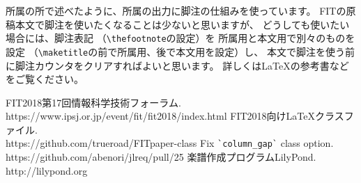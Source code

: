 \documentclass{FITpaper}
\begin{document}
所属の所で述べたように、所属の出力に脚注の仕組みを使っています。
FITの原稿本文で脚注を使いたくなることは少ないと思いますが、
どうしても使いたい場合には、脚注表記
（\texttt{\textbackslash thefootnote}の設定）を
所属用と本文用で別々のものを設定
（\texttt{\textbackslash maketitle}の前で所属用、後で本文用を設定）し、
本文で脚注を使う前に脚注カウンタをクリアすればよいと思います。
詳しくは\LaTeX の参考書などをご覧ください。


\begin{thebibliography}{9}

  FIT2018第17回情報科学技術フォーラム. \\
  https://www.ipsj.or.jp/event/fit/fit2018/index.html
  FIT2018向け\LaTeX クラスファイル. \\
  https://github.com/trueroad/FITpaper-class
  Fix \verb|`column_gap`| class option. \\
  https://github.com/abenori/jlreq/pull/25
  楽譜作成プログラムLilyPond. \\
  http://lilypond.org

\end{thebibliography}
\end{document}
